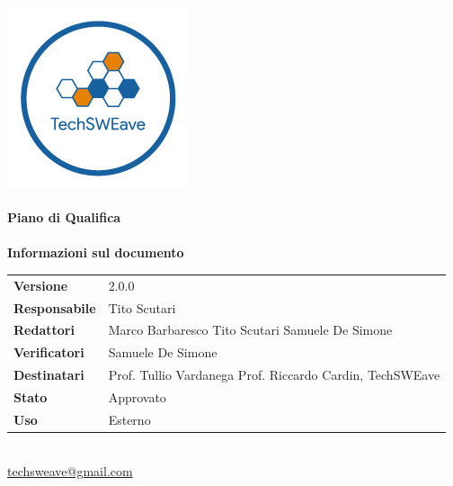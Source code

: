 \documentclass[a4paper]{article}
\begin{document}
\begin{titlepage}
    \begin{center}
        \includegraphics{../../../Images/logo}\\
        \vspace{20px}
        \textcolor{logo}{\hrulefill}\\
        \vspace{20px}
        \textbf{\huge\textcolor{logo}{Piano di Qualifica}}\\
        \vspace{10px}
        \textcolor{logo}{\hrulefill}\\
        \vspace{40px}
        \textbf{\Large Informazioni sul documento}\\
        \vspace{20px}
        \begin{tabular}{p{100px} | p{100px}}
            \textbf{Versione}     & 2.0.0                                                                      \\
            \textbf{Responsabile} & Tito Scutari                                                               \\
            \textbf{Redattori}    & Marco Barbaresco \newline Tito Scutari \newline Samuele De Simone          \\
            \textbf{Verificatori} & Samuele De Simone                                                          \\
            \textbf{Destinatari}  & Prof. Tullio Vardanega \newline Prof. Riccardo Cardin, \newline TechSWEave \\
            \textbf{Stato}        & Approvato                                                                  \\
            \textbf{Uso}          & Esterno                                                                    \\
        \end{tabular}\\
        \vspace{60px}
        \href{mailto:techsweave@gmail.com}{techsweave@gmail.com}\\

    \end{center}
\end{titlepage}
\end{document}
